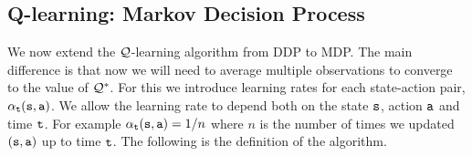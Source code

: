 \subsection{Q-learning: Markov Decision Process}


We now extend the $\mathcal{Q}$-learning algorithm from DDP to MDP. The main
difference is that now we will need to average multiple observations
to converge to the value of $\mathcal{Q}^*$. For this we introduce
learning rates for each state-action pair, $\alpha_{\tt t}({\tt s},{\tt a})$. We allow the
learning rate to depend both on the state ${\tt s}$, action ${\tt a}$
and time ${\tt t}$. For example $\alpha_{\tt t}({\tt s},{\tt a})=1/n$
where $n$ is the number of times we updated $({\tt s},{\tt a})$ up to
time ${\tt t}$. The following is the definition of the algorithm.







